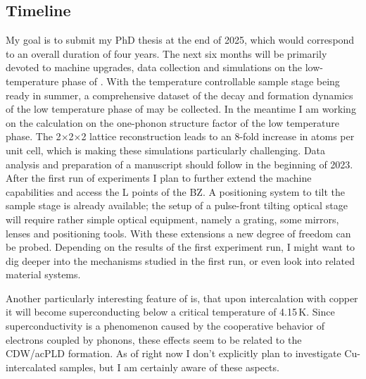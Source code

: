 \subsection*{Timeline}
My goal is to submit my PhD thesis at the end of 2025, which would correspond to an overall duration of four years.
The next six months will be primarily devoted to machine upgrades, data collection and simulations on the low-temperature phase of \ts.
With the temperature controllable sample stage being ready in summer, a comprehensive dataset of the decay and formation dynamics of the low temperature phase of \ts may be collected.
In the meantime I am working on the calculation on the one-phonon structure factor of the low temperature phase.
The 2$\times$2$\times$2 lattice reconstruction leads to an 8-fold increase in atoms per unit cell, which is making these simulations particularly challenging.
Data analysis and preparation of a manuscript should follow in the beginning of 2023.
After the first run of experiments I plan to further extend the machine capabilities and access the L points of the \ac{BZ}.
A positioning system to tilt the sample stage is already available; the setup of a pulse-front tilting optical stage will require rather simple optical equipment, namely a grating, some mirrors, lenses and positioning tools.
With these extensions a new degree of freedom can be probed.
Depending on the results of the first experiment run, I might want to dig deeper into the mechanisms studied in the first run, or even look into related material systems.

Another particularly interesting feature of \ts\space is, that upon intercalation with copper it will become superconducting below a critical temperature of 4.15\,K\cite{morosan2006}.
Since superconductivity is a phenomenon caused by the cooperative behavior of electrons coupled by phonons, these effects seem to be related to the \ac{CDW}/ac{PLD} formation.
As of right now I don't explicitly plan to investigate Cu-intercalated samples, but I am certainly aware of these aspects.

